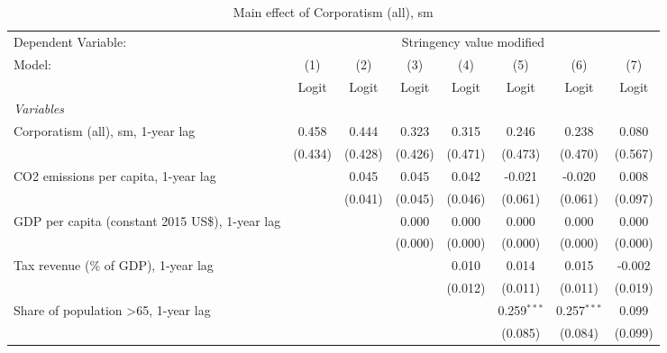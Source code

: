 
\begin{table}[htbp]
   \caption{Main effect of Corporatism (all), sm}
   \centering
   \begin{tabular}{lccccccc}
      \toprule
      Dependent Variable: & \multicolumn{7}{c}{Stringency value modified}\\
      Model:                                                & (1)     & (2)     & (3)     & (4)     & (5)           & (6)           & (7)\\  
                                                            &  Logit  & Logit   & Logit   & Logit   & Logit         & Logit         & Logit\\  
      \midrule
      \emph{Variables}\\
      Corporatism (all), sm, 1-year lag                     & 0.458   & 0.444   & 0.323   & 0.315   & 0.246         & 0.238         & 0.080\\   
                                                            & (0.434) & (0.428) & (0.426) & (0.471) & (0.473)       & (0.470)       & (0.567)\\   
      CO2 emissions per capita, 1-year lag                  &         & 0.045   & 0.045   & 0.042   & -0.021        & -0.020        & 0.008\\   
                                                            &         & (0.041) & (0.045) & (0.046) & (0.061)       & (0.061)       & (0.097)\\   
      GDP per capita (constant 2015 US\$), 1-year lag       &         &         & 0.000   & 0.000   & 0.000         & 0.000         & 0.000\\   
                                                            &         &         & (0.000) & (0.000) & (0.000)       & (0.000)       & (0.000)\\   
      Tax revenue (\% of GDP), 1-year lag                   &         &         &         & 0.010   & 0.014         & 0.015         & -0.002\\   
                                                            &         &         &         & (0.012) & (0.011)       & (0.011)       & (0.019)\\   
      Share of population >65, 1-year lag                   &         &         &         &         & 0.259$^{***}$ & 0.257$^{***}$ & 0.099\\   
                                                            &         &         &         &         & (0.085)       & (0.084)       & (0.099)\\   

\end{tabular}
\end{table}
